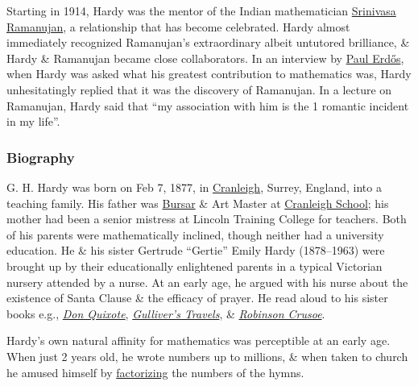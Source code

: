 \documentclass{article}
\begin{document}
Starting in 1914, {\sc Hardy} was the mentor of the Indian mathematician \href{https://en.wikipedia.org/wiki/Srinivasa_Ramanujan}{\sc Srinivasa Ramanujan}, a relationship that has become celebrated. {\sc Hardy} almost immediately recognized {\sc Ramanujan}'s extraordinary albeit untutored brilliance, \& {\sc Hardy \& Ramanujan} became close collaborators. In an interview by \href{https://en.wikipedia.org/wiki/Paul_Erd%C5%91s}{\sc Paul Erd\H{o}s}, when {\sc Hardy} was asked what his greatest contribution to mathematics was, {\sc Hardy} unhesitatingly replied that it was the discovery of {\sc Ramanujan}. In a lecture on {\sc Ramanujan}, {\sc Hardy} said that ``my association with him is the 1 romantic incident in my life''.

\subsubsection{Biography}
{\sc G. H. Hardy} was born on Feb 7, 1877, in \href{https://en.wikipedia.org/wiki/Cranleigh}{Cranleigh}, Surrey, England, into a teaching family. His father was \href{https://en.wikipedia.org/wiki/Bursar}{Bursar} \& Art Master at \href{https://en.wikipedia.org/wiki/Cranleigh_School}{Cranleigh School}; his mother had been a senior mistress at Lincoln Training College for teachers. Both of his parents were mathematically inclined, though neither had a university education. He \& his sister Gertrude ``Gertie'' Emily Hardy (1878--1963) were brought up by their educationally enlightened parents in a typical Victorian nursery attended by a nurse. At an early age, he argued with his nurse about the existence of Santa Clause \& the efficacy of prayer. He read aloud to his sister books e.g., \href{https://en.wikipedia.org/wiki/Don_Quixote}{\it Don Quixote}, \href{https://en.wikipedia.org/wiki/Gulliver%27s_Travels}{\it Gulliver's Travels}, \& \href{https://en.wikipedia.org/wiki/Robinson_Crusoe}{\it Robinson Crusoe}.

{\sc Hardy}'s own natural affinity for mathematics was perceptible at an early age. When just 2 years old, he wrote numbers up to millions, \& when taken to church he amused himself by \href{https://en.wikipedia.org/wiki/Factorize}{factorizing} the numbers of the hymns.
\end{document}
